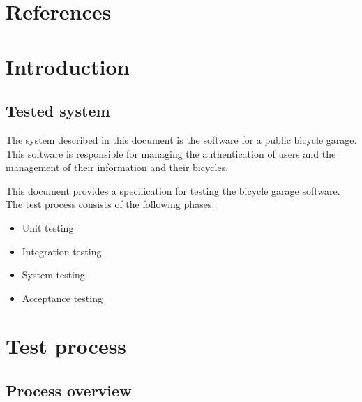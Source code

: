 \documentclass[12pt,titlepage,bibliography=totoc]{article}
\begin{document}


\maketitle
\newpage
\tableofcontents
\thispagestyle{empty}
\setcounter{page}{0}
\newpage


\section{References}
\label{sec:references}


\section{Introduction}
\label{sec:introduction}

\subsection{Tested system}
\label{subsec:tested-system}

The system described in this document is the software for a public bicycle
garage. This software is responsible for managing the authentication of users
and the management of their information and their bicycles.

This document provides a specification for testing the bicycle garage software.
The test process consists of the following phases:

\begin{itemize}
	\item Unit testing
	\item Integration testing
	\item System testing
	\item Acceptance testing
\end{itemize}


\section{Test process}
\label{sec:test-process}

\subsection{Process overview}
\label{subsec:test-process-process-overview}
\end{document}
